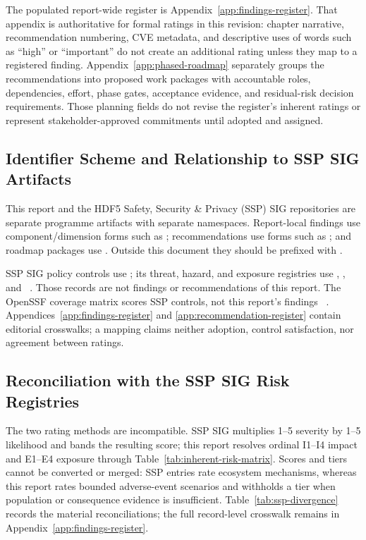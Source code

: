 \documentclass[../main.tex]{subfiles}
\begin{document}
The populated report-wide register is Appendix~\ref{app:findings-register}.
That appendix is authoritative for formal ratings in this revision: chapter
narrative, recommendation numbering, CVE metadata, and descriptive uses of
words such as ``high'' or ``important'' do not create an additional rating
unless they map to a registered finding.
Appendix~\ref{app:phased-roadmap} separately groups the recommendations into
proposed work packages with accountable roles, dependencies, effort, phase
gates, acceptance evidence, and residual-risk decision requirements. Those
planning fields do not revise the register's inherent ratings or represent
stakeholder-approved commitments until adopted and assigned.

\subsection{Identifier Scheme and Relationship to SSP SIG Artifacts}
\label{sec:identifier-scheme}

This report and the HDF5 Safety, Security \& Privacy (SSP) SIG repositories are
separate programme artifacts with separate namespaces. Report-local findings
use component/dimension forms such as ; recommendations use
forms such as ; and roadmap packages use . Outside
this document they should be prefixed with .

SSP SIG policy controls use ; its threat, hazard,
and exposure registries use , , and
~\cite{hdf5-ssp-controls,hdf5-ssp-atk,hdf5-ssp-haz,hdf5-ssp-exp}.
Those records are not findings or recommendations of this report. The OpenSSF
coverage matrix scores SSP controls, not this report's findings
~\cite{hdf5-ssp-osps-matrix}. Appendices~\ref{app:findings-register} and
\ref{app:recommendation-register} contain editorial crosswalks; a mapping
claims neither adoption, control satisfaction, nor agreement between ratings.

\subsection{Reconciliation with the SSP SIG Risk Registries}
\label{sec:rubric-reconciliation}

The two rating methods are incompatible. SSP SIG multiplies 1--5 severity by
1--5 likelihood and bands the resulting score; this report resolves ordinal
I1--I4 impact and E1--E4 exposure through
Table~\ref{tab:inherent-risk-matrix}. Scores and tiers cannot be converted or
merged: SSP entries rate ecosystem mechanisms, whereas this report rates
bounded adverse-event scenarios and withholds a tier when population or
consequence evidence is insufficient. Table~\ref{tab:ssp-divergence} records
the material reconciliations; the full record-level crosswalk remains in
Appendix~\ref{app:findings-register}.
\end{document}
